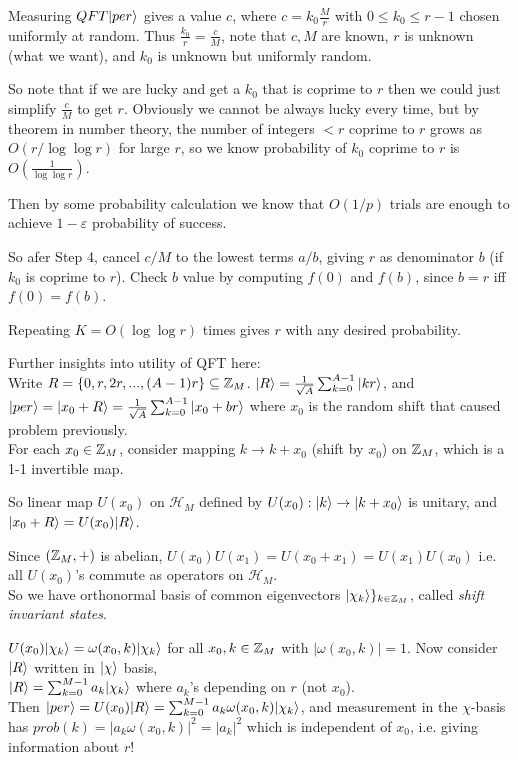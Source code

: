 \documentclass[a4paper]{article}
\begin{document}
Measuring $QFT |per\rangle$ gives a value $c$, where $c = k_0 \frac{M}{r}$ with $0 \leq k_0 \leq r-1$ chosen uniformly at random. Thus $\frac{k_0}{r} = \frac{c}{M}$, note that $c,M$ are known, $r$ is unknown (what we want), and $k_0$ is unknown but uniformly random.

So note that if we are lucky and get a $k_0$ that is coprime to $r$ then we could just simplify $\frac{c}{M}$ to get $r$. Obviously we cannot be always lucky every time, but by theorem in number theory, the number of integers $<r$ coprime to $r$ grows as $O(r/\log\log r)$ for large $r$, so we know probability of $k_0$ coprime to $r$ is $O(\frac{1}{\log\log r})$.

Then by some probability calculation we know that $O(1/p)$ trials are enough to achieve $1-\varepsilon$ probability of success.

So afer Step 4, cancel $c/M$ to the lowest terms $a/b$, giving $r$ as denominator $b$ (if $k_0$ is coprime to $r$). Check $b$ value by computing $f(0)$ and $f(b)$, since $b=r$ iff $f(0) = f(b)$.

Repeating $K=O(\log\log r)$ times gives $r$ with any desired probability.

Further insights into utility of QFT here:\\
Write $R = \{0,r,2r,...,(A-1)r\} \subseteq \mathbb{Z}_M$. $|R\rangle = \frac{1}{\sqrt{A}} \sum_{k=0}^{A-1} |kr\rangle$, and $|per\rangle = |x_0 + R\rangle = \frac{1}{\sqrt{A}} \sum_{k=0}^{A-1} |x_0+br \rangle$ where $x_0$ is the random shift that caused problem previously.\\
For each $x_0 \in \mathbb{Z}_M$, consider mapping $k \to k+x_0$ (shift by $x_0$) on $\mathbb{Z}_M$, which is a 1-1 invertible map.

So linear map $U(x_0)$ on $\mathcal{H}_M$ defined by $U(x_0): |k\rangle \to |k+x_0\rangle$ is unitary, and $|x_0+R \rangle = U(x_0) |R\rangle$.

Since $(\mathbb{Z}_M,+)$ is abelian, $U(x_0)U(x_1) = U(x_0+x_1) =U(x_1)U(x_0)$ i.e. all $U(x_0)$'s commute as operators on $\mathcal{H}_M$.\\
So we have orthonormal basis of common eigenvectors $|\chi_k\rangle\}_{k \in \mathbb{Z}_M}$, called \emph{shift invariant states}.

$U(x_0)|\chi_k\rangle = \omega(x_0,k)|\chi_k\rangle$ for all $x_0,k \in \mathbb{Z}_M$ with $|\omega(x_0,k)| = 1$. Now consider $|R\rangle$ written in $|\chi\rangle$ basis,\\
$|R\rangle = \sum_{k=0}^{M-1} a_k | \chi_k\rangle$ where $a_k$'s depending on $r$ (not $x_0$).\\
Then $|per\rangle = U(x_0) |R\rangle = \sum_{k=0}^{M-1}a_k \omega(x_0,k) |\chi_k\rangle$, and measurement in the $\chi$-basis has $prob(k) = |a_k \omega(x_0,k)|^2 = |a_k|^2$ which is independent of $x_0$, i.e. giving information about $r$!
\end{document}
